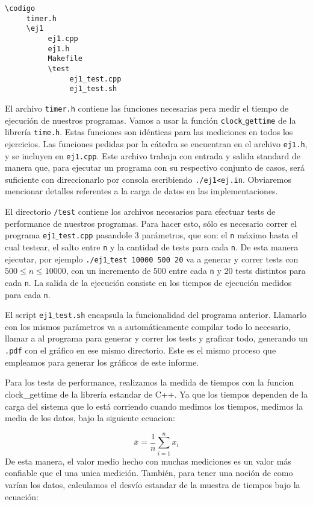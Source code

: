 \documentclass[10pt,a4paper]{article}
\begin{document}
\begin{verbatim}
\codigo
	 timer.h
     \ej1
          ej1.cpp
          ej1.h
          Makefile
          \test
               ej1_test.cpp
               ej1_test.sh
\end{verbatim}

El archivo \texttt{timer.h} contiene las funciones necesarias pera medir el tiempo de ejecución de nuestros programas. Vamos a usar la función \texttt{clock$\_$gettime} de la librería \texttt{time.h}. Estas funciones son idénticas para las mediciones en todos los ejercicios. Las funciones pedidas por la cátedra se encuentran en el archivo \texttt{ej1.h}, y se incluyen en \texttt{ej1.cpp}. Este archivo trabaja con entrada y salida standard de manera que, para ejecutar un programa con su respectivo conjunto de casos, será suficiente con direccionarlo por consola escribiendo \texttt{./ej1<ej.in}. Obviaremos mencionar detalles referentes a la carga de datos en las implementaciones.

El directorio \texttt{/test} contiene los archivos necesarios para efectuar tests de performance de nuestros programas. Para hacer esto, sólo es necesario correr el programa \texttt{ej1$\_$test.cpp} pasandole 3 parámetros, que son: el \texttt{n} máximo hasta el cual testear, el salto entre \texttt{n} y la cantidad de tests para cada \texttt{n}. De esta manera ejecutar, por ejemplo \texttt{./ej1$\_$test 10000 500 20} va a generar y correr tests con $500 \leq n \leq 10000$, con un incremento de 500 entre cada \texttt{n} y 20 tests distintos para cada \texttt{n}. La salida de la ejecuci\'on consiste en los tiempos de ejecuci\'on medidos para cada \texttt{n}.

El script \texttt{ej1$\_$test.sh} encapsula la funcionalidad del programa anterior. Llamarlo con los mismos parámetros va a automáticamente compilar todo lo necesario, llamar a al programa para generar y correr los tests y graficar todo, generando un \texttt{.pdf} con el gráfico en ese mismo directorio. Este es el mismo proceso que empleamos para generar los gráficos de este informe.

Para los tests de performance, realizamos la medida de tiempos con la funcion clock\_gettime de la librería estandar de C++.
Ya que los tiempos dependen de la carga del sistema que lo está corriendo cuando medimos los tiempos, medimos la media de los datos, bajo la
siguiente ecuacion:

\begin{equation}
 \bar{x} = \frac{1}{n} \sum_{i=1}^{n}x_{i}
\end{equation}
De esta manera, el valor medio hecho con muchas mediciones es un valor más confiable que el una unica medición.
También, para tener una noción de como varían los datos, calculamos el desvío estandar de la muestra de tiempos bajo la ecuación:
\end{document}
